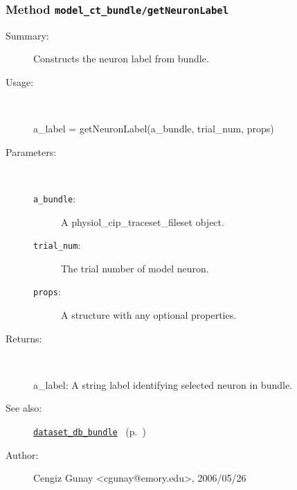 \subsubsection[Method \texttt{getNeuronLabel}]{Method \texttt{model\_ct\_bundle/getNeuronLabel}}%
%
\label{ref_model_ct_bundle__getNeuronLabel}%
\hypertarget{ref_model_ct_bundle__getNeuronLabel}{}%
\begin{description}
\item[Summary:]Constructs the neuron label from bundle.
%
\item[Usage:]~%
\begin{lyxcode}%
a\_label = getNeuronLabel(a\_bundle, trial\_num, props)
%
\end{lyxcode}%
%
%
\item[Parameters:]~
\begin{description}%
\item[\texttt{a\_bundle}:]
 A physiol\_cip\_traceset\_fileset object.
\item[\texttt{trial\_num}:]
 The trial number of model neuron.
\item[\texttt{props}:]
 A structure with any optional properties.
\end{description}%
%
\item[Returns:]~

	a\_label: A string label identifying selected neuron in bundle.
%
%
\item[See also:]%
\hyperlink{ref_dataset_db_bundle}{\texttt{dataset\_db\_bundle}}%
\ (p.~\pageref{ref_dataset_db_bundle})%
%
%
\item[Author:]%
Cengiz Gunay <cgunay@emory.edu>, 2006/05/26%
\end{description}
\methodline%
